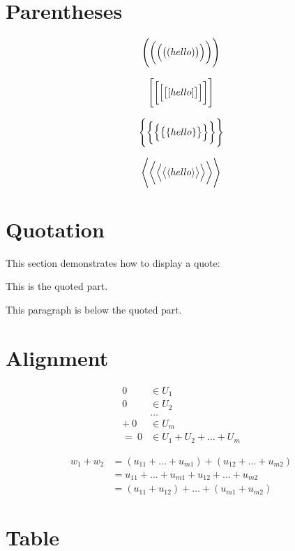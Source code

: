 \documentclass[12pt, letterpaper, oneside]{article}
\begin{document}
\section{Parentheses}

\[\Biggl(\biggl(\Bigl(\bigl((hello)\bigr)\Bigr)\biggr)\Biggr)\]

\[\Biggl[\biggl[\Bigl[\bigl[[hello]\bigr]\Bigr]\biggr]\Biggr]\]

\[\Biggl\{\biggl\{\Bigl\{\bigl\{\{hello\}\bigr\}\Bigr\}\biggr\}\Biggr\}\]

\[
  \Biggl \langle \biggl \langle \Bigl \langle \bigl \langle
    \langle
      hello
    \rangle
  \bigr \rangle \Bigr \rangle \biggr \rangle \Biggr \rangle
\]

\section{Quotation}

This section demonstrates how to display a quote:

\begin{displayquote}
  This is the quoted part.
\end{displayquote}

This paragraph is below the quoted part.

\section{Alignment}

\begin{align*}
  0 & \in U_1 \\
  0 & \in U_2 \\
    & \ldots \\
+ \ 0 & \in U_m \\
= \ 0 & \in U_1 + U_2 + \ldots + U_m
\end{align*}

\begin{align*}
  w_1 + w_2 & = (u_{11} + \ldots + u_{m1}) + (u_{12} + \ldots + u_{m2}) \\
            & = u_{11} + \ldots + u_{m1} + u_{12} + \ldots + u_{m2} \\
            & = (u_{11} + u_{12}) + \ldots + (u_{m1} + u_{m2})
\end{align*}

\section{Table}
\end{document}
